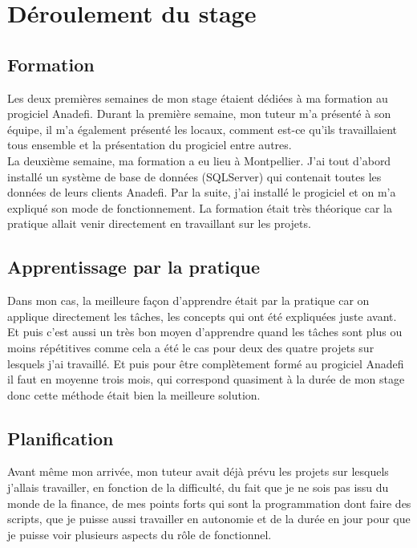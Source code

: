 \section{Déroulement du stage}
\subsection{Formation}

Les deux premières semaines de mon stage étaient dédiées à ma formation au progiciel Anadefi. Durant la première semaine, mon tuteur m'a présenté à son équipe, il m'a également présenté les locaux, comment est-ce qu'ils travaillaient tous ensemble et la présentation du progiciel entre autres.\\

La deuxième semaine, ma formation a eu lieu à Montpellier. J'ai tout d'abord installé un système de base de données (SQLServer) qui contenait toutes les données de leurs clients Anadefi. Par la suite, j'ai installé le progiciel et on m'a expliqué son mode de fonctionnement. La formation était très théorique car la pratique allait venir directement en travaillant sur les projets.

\subsection{Apprentissage par la pratique}

Dans mon cas, la meilleure façon d'apprendre était par la pratique car on applique directement les tâches, les concepts qui ont été expliquées juste avant. Et puis c'est aussi un très bon moyen d'apprendre quand les tâches sont plus ou moins répétitives comme cela a été le cas pour deux des quatre projets sur lesquels j'ai travaillé. Et puis pour être complètement formé au progiciel Anadefi il faut en moyenne trois mois, qui correspond quasiment à la durée de mon stage donc cette méthode était bien la meilleure solution.

\subsection{Planification} 

Avant même mon arrivée, mon tuteur avait déjà prévu les projets sur lesquels j'allais travailler, en fonction de la difficulté, du fait que je ne sois pas issu du monde de la finance, de mes points forts qui sont la programmation dont faire des scripts, que je puisse aussi travailler en autonomie et de la durée en jour pour que je puisse voir plusieurs aspects du rôle de fonctionnel.

